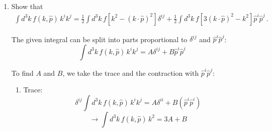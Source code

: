 \begin{enumerate}
    \item Show that
          \begin{align}
              \int d^3 k \, f(k, \hat{p}) \, k^i k^j = \frac{1}{2} \int d^3 k \, f\left[k^2 - (k \cdot \hat{p})^2\right] \delta^{ij} + \frac{1}{2} \int d^3 k \, f\left[3(k \cdot \hat{p})^2 - k^2\right] \hat{p}^i \hat{p}^j\,.
          \end{align}

          \begin{solution}
              The given integral can be split into parts proportional to $\delta^{ij}$ and $\hat{p}^i \hat{p}^j$:
              $$\int d^3 k \, f(k, \hat{p}) \, k^i k^j = A \delta^{ij} + B \hat{p}^i \hat{p}^j $$

              To find $A$ and $B$, we take the trace and the contraction with $\hat{p}^i \hat{p}^j$:
              \begin{enumerate}

                  \item Trace:
                        $$ \delta^{ij} \int d^3 k \, f(k, \hat{p}) \, k^i k^j = A \delta^{ii} + B (\hat{p}^i \hat{p}^i)$$
                        $$\rightarrow  \int d^3 k \, f(k, \hat{p}) \, k^2 = 3A + B $$


\end{enumerate}
\end{solution}
\end{enumerate}
